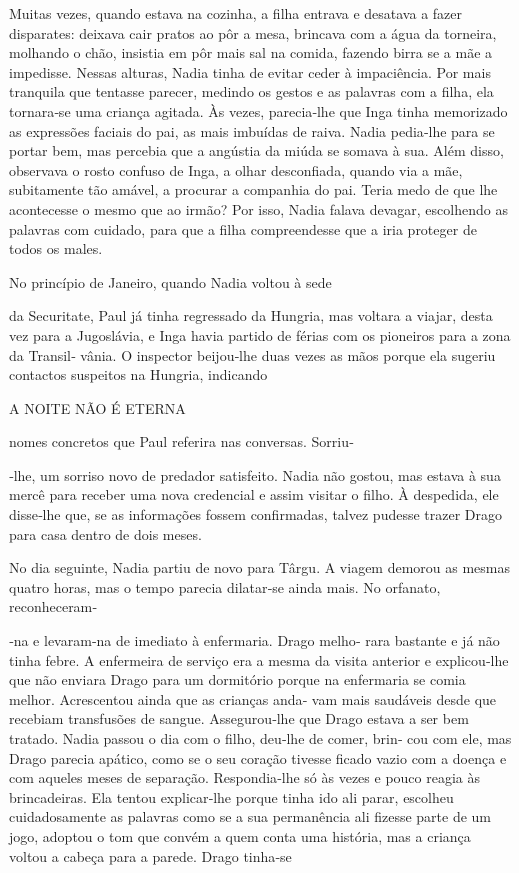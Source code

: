 Muitas vezes, quando estava na cozinha, a filha entrava e desatava a
fazer disparates: deixava cair pratos ao pôr a mesa, brincava com a água
da torneira, molhando o chão, insistia em pôr mais sal na comida,
fazendo birra se a mãe a impedisse. Nessas alturas, Nadia tinha de
evitar ceder à impaciência. Por mais tranquila que tentasse parecer,
medindo os gestos e as palavras com a filha, ela tornara‑se uma criança
agitada. Às vezes, parecia‑lhe que Inga tinha memorizado as expressões
faciais do pai, as mais imbuídas de raiva. Nadia pedia‑lhe para se
portar bem, mas percebia que a angústia da miúda se somava à sua. Além
disso, observava o rosto confuso de Inga, a olhar desconfiada, quando
via a mãe, subitamente tão amável, a procurar a companhia do pai. Teria
medo de que lhe acontecesse o mesmo que ao irmão? Por isso, Nadia falava
devagar, escolhendo as palavras com cuidado, para que a filha
compreendesse que a iria proteger de todos os males.

No princípio de Janeiro, quando Nadia voltou à sede

da Securitate, Paul já tinha regressado da Hungria, mas voltara a
viajar, desta vez para a Jugoslávia, e Inga havia partido de férias com
os pioneiros para a zona da Transil‑ vânia. O inspector beijou‑lhe duas
vezes as mãos porque ela sugeriu contactos suspeitos na Hungria,
indicando

A NOITE NÃO É ETERNA

nomes concretos que Paul referira nas conversas. Sorriu‑

‑lhe, um sorriso novo de predador satisfeito. Nadia não gostou, mas
estava à sua mercê para receber uma nova credencial e assim visitar o
filho. À despedida, ele disse‑lhe que, se as informações fossem
confirmadas, talvez pudesse trazer Drago para casa dentro de dois meses.

No dia seguinte, Nadia partiu de novo para Târgu. A viagem demorou as
mesmas quatro horas, mas o tempo parecia dilatar‑se ainda mais. No
orfanato, reconheceram‑

‑na e levaram‑na de imediato à enfermaria. Drago melho‑ rara bastante e
já não tinha febre. A enfermeira de serviço era a mesma da visita
anterior e explicou‑lhe que não enviara Drago para um dormitório porque
na enfermaria se comia melhor. Acrescentou ainda que as crianças anda‑
vam mais saudáveis desde que recebiam transfusões de sangue.
Assegurou‑lhe que Drago estava a ser bem tratado. Nadia passou o dia com
o filho, deu‑lhe de comer, brin‑ cou com ele, mas Drago parecia apático,
como se o seu coração tivesse ficado vazio com a doença e com aqueles
meses de separação. Respondia‑lhe só às vezes e pouco reagia às
brincadeiras. Ela tentou explicar‑lhe porque tinha ido ali parar,
escolheu cuidadosamente as palavras como se a sua permanência ali
fizesse parte de um jogo, adoptou o tom que convém a quem conta uma
história, mas a criança voltou a cabeça para a parede. Drago tinha‑se

